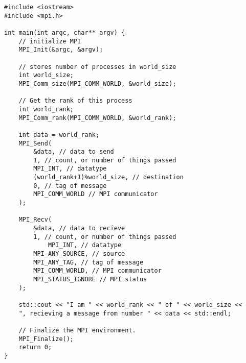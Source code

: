 \documentclass[12pt]{article}
\begin{document}
\begin{verbatim}
#include <iostream>
#include <mpi.h>

int main(int argc, char** argv) {
	// initialize MPI
	MPI_Init(&argc, &argv);

	// stores number of processes in world_size
	int world_size;
	MPI_Comm_size(MPI_COMM_WORLD, &world_size);

	// Get the rank of this process
	int world_rank;
	MPI_Comm_rank(MPI_COMM_WORLD, &world_rank);

	int data = world_rank;
	MPI_Send(
		&data, // data to send
		1, // count, or number of things passed
		MPI_INT, // datatype
		(world_rank+1)%world_size, // destination
		0, // tag of message
		MPI_COMM_WORLD // MPI communicator
	);

	MPI_Recv(
		&data, // data to recieve
		1, // count, or number of things passed
	    	MPI_INT, // datatype
		MPI_ANY_SOURCE, // source
		MPI_ANY_TAG, // tag of message
		MPI_COMM_WORLD, // MPI communicator
		MPI_STATUS_IGNORE // MPI status
	);

	std::cout << "I am " << world_rank << " of " << world_size <<
	", recieving a message from number " << data << std::endl;

	// Finalize the MPI environment.
	MPI_Finalize();
	return 0;
}

\end{verbatim}
\end{document}
